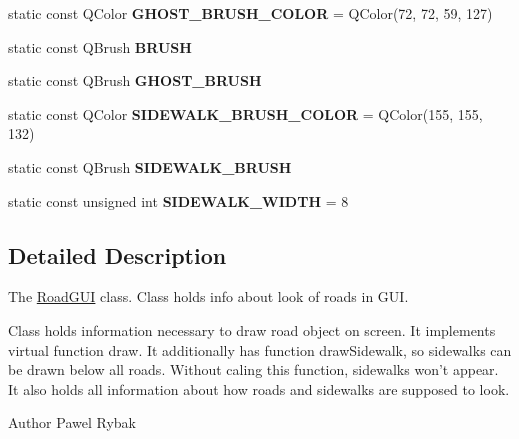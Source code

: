 \begin{DoxyCompactItemize}
\item 
\hypertarget{classRoadGUI_af38f8106a9e1b0f7dc60fe6719b79034}{static const Q\-Color {\bfseries G\-H\-O\-S\-T\-\_\-\-B\-R\-U\-S\-H\-\_\-\-C\-O\-L\-O\-R} = Q\-Color(72, 72, 59, 127)}\label{classRoadGUI_af38f8106a9e1b0f7dc60fe6719b79034}

\item 
\hypertarget{classRoadGUI_a1bac52c458cdf4ea063345186bd59a88}{static const Q\-Brush {\bfseries B\-R\-U\-S\-H}}\label{classRoadGUI_a1bac52c458cdf4ea063345186bd59a88}

\item 
\hypertarget{classRoadGUI_a0c717e32cd1bea3c52a840f3915c7785}{static const Q\-Brush {\bfseries G\-H\-O\-S\-T\-\_\-\-B\-R\-U\-S\-H}}\label{classRoadGUI_a0c717e32cd1bea3c52a840f3915c7785}

\item 
\hypertarget{classRoadGUI_aaea72d54185d2dd5226f71ffe12b17a8}{static const Q\-Color {\bfseries S\-I\-D\-E\-W\-A\-L\-K\-\_\-\-B\-R\-U\-S\-H\-\_\-\-C\-O\-L\-O\-R} = Q\-Color(155, 155, 132)}\label{classRoadGUI_aaea72d54185d2dd5226f71ffe12b17a8}

\item 
\hypertarget{classRoadGUI_a1a0d50da26147c147851f0ce7e4becde}{static const Q\-Brush {\bfseries S\-I\-D\-E\-W\-A\-L\-K\-\_\-\-B\-R\-U\-S\-H}}\label{classRoadGUI_a1a0d50da26147c147851f0ce7e4becde}

\item 
\hypertarget{classRoadGUI_a2ebb95704c366ffb0bd8d2dcd0380b27}{static const unsigned int {\bfseries S\-I\-D\-E\-W\-A\-L\-K\-\_\-\-W\-I\-D\-T\-H} = 8}\label{classRoadGUI_a2ebb95704c366ffb0bd8d2dcd0380b27}

\end{DoxyCompactItemize}


\subsection{Detailed Description}
The \hyperlink{classRoadGUI}{Road\-G\-U\-I} class. Class holds info about look of roads in G\-U\-I. 

Class holds information necessary to draw road object on screen. It implements virtual function draw. It additionally has function draw\-Sidewalk, so sidewalks can be drawn below all roads. Without caling this function, sidewalks won't appear. It also holds all information about how roads and sidewalks are supposed to look. \begin{DoxyAuthor}{Author}
Pawel Rybak 
\end{DoxyAuthor}


